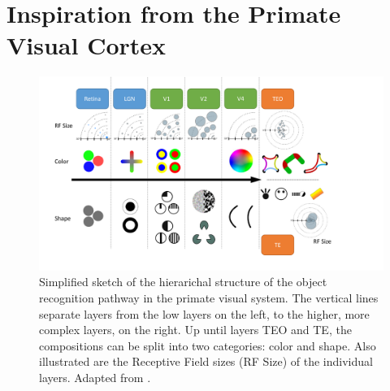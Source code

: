 \section{Inspiration from the Primate Visual Cortex}
\label{sec:pvc}

\begin{figure}[h!]
\centering
\includegraphics[width=1.0\textwidth]{graphics/pvc_figure1}
\caption[Object Recognition Pathway]{
Simplified sketch of the hierarichal structure of the object recognition pathway in the primate visual system.
The vertical lines separate layers from the low layers on the left, to the higher, more complex layers, on the right.
Up until layers TEO and TE, the compositions can be split into two categories: color and shape.
Also illustrated are the Receptive Field sizes (RF Size) of the individual layers.
Adapted from \cite{kruger2013deep}.
}
\label{fig:pcv1}
\end{figure}